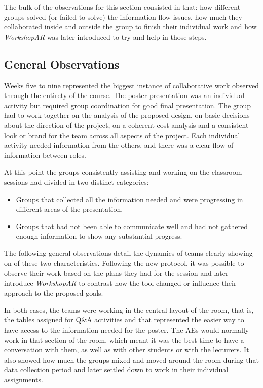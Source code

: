 The bulk of the observations for this section consisted in that: how different groups solved (or failed to solve) the information flow issues, how much they collaborated
inside and outside the group to finish their individual work and how \emph{WorkshopAR} was later introduced to try and help in those steps.

\subsection{General Observations \label{sec:6-5-1}}

Weeks five to nine represented the biggest instance of collaborative work observed through the entirety of the course. The poster presentation was an individual activity
but required group coordination for good final presentation. The group had to work together on the analysis of the proposed design, on basic decisions about the direction
of the project, on a coherent cost analysis and a consistent look or brand for the team across all aspects of the project. Each individual activity needed information from
the others, and there was a clear flow of information between roles.

At this point the groups consistently assisting and working on the classroom sessions had divided in two distinct categories:

\begin{itemize}
    \item Groups that collected all the information needed and were progressing in different areas of the presentation.
    \item Groups that had not been able to communicate well and had not gathered enough information to show any substantial progress.
\end{itemize}

The following general observations detail the dynamics of teams clearly showing on of these two characteristics. Following the new protocol, it was possible to observe
their work based on the plans they had for the session and later introduce \emph{WorkshopAR} to contrast how the tool changed or influence their approach to the proposed
goals.

In both cases, the teams were working in the central layout of the room, that is, the tables assigned for Q\&A activities and that represented the easier way to have
access to the information needed for the poster. The \ac{AE}s would normally work in that section of the room, which meant it was the best time to have a conversation with
them, as well as with other students or with the lecturers. It also showed how much the groups mixed and moved around the room during that data collection period and later
settled down to work in their individual assignments.


